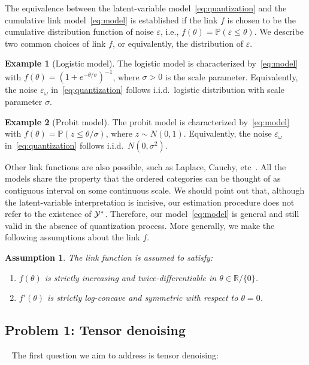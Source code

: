 \documentclass[11pt]{article}
\theoremstyle{plain}
\newtheorem{assumption}{Assumption}
\theoremstyle{definition}
\newtheorem{example}{Example}
\begin{document}
The equivalence between the latent-variable model~\eqref{eq:quantization} and the cumulative link model~\eqref{eq:model} is established if the link $f$ is chosen to be the cumulative distribution function of noise $\varepsilon$, i.e., $f(\theta)=\mathbb{P}(\varepsilon\leq \theta)$. We describe two common choices of link $f$, or equivalently, the distribution of $\varepsilon$.

\begin{example}[Logistic model] The logistic model is characterized by~\eqref{eq:model} with $f(\theta)=(1+e^{-\theta/\sigma})^{-1}$, where $\sigma>0$ is the scale parameter. Equivalently, the noise $\varepsilon_\omega$ in~\eqref{eq:quantization} follows i.i.d.\ logistic distribution with scale parameter $\sigma$.
\end{example}
\begin{example}[Probit model] The probit model is characterized by~\eqref{eq:model} with
$f(\theta)=\mathbb{P}(z\leq \theta/\sigma)$, where $z\sim N(0,1)$. Equivalently, the noise $\varepsilon_\omega$ in~\eqref{eq:quantization} follows i.i.d.\ $N(0,\sigma^2)$.
\end{example}
Other link functions are also possible, such as Laplace, Cauchy, etc~\cite{mccullagh1980regression}. All the models share the property that the ordered categories can be thought of as contiguous interval on some continuous scale. We should point out that, although the latent-variable interpretation is incisive, our estimation procedure does not refer to the existence of $\mathcal{Y}^*$. Therefore, our model~\eqref{eq:model} is general and still valid in the absence of quantization process. More generally, we make the following assumptions about the link $f$.

\begin{assumption}\label{ass:link}
The link function is assumed to satisfy:
\begin{enumerate}
\item $f(\theta)$ is strictly increasing and twice-differentiable in $\theta\in\mathbb{R}/\{0\}$.
\item $f'(\theta)$ is strictly log-concave and symmetric with respect to $\theta=0$.
\end{enumerate}
\end{assumption}

\subsection{Problem 1: Tensor denoising}~\label{sec:denoising}
The first question we aim to address is tensor denoising:
\end{document}
